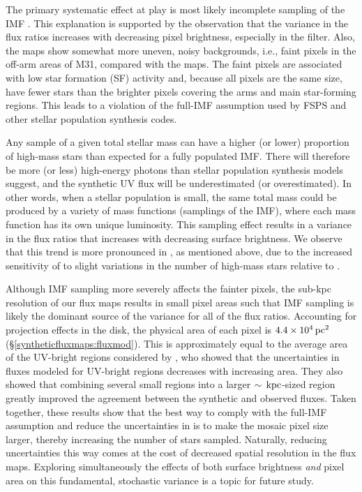 \documentclass[iop, tighten]{emulateapj}
\begin{document}
The primary systematic effect at play is most likely incomplete sampling of the
IMF \citep{Elmegreen:1999, Bastian:2010, Fumagalli:2011, daSilva:2012,
daSilva:2014}. This explanation is supported by the observation that the
variance in the flux ratios increases with decreasing pixel brightness,
especially in the \fuv{} filter. Also, the \fxsfh{} maps show somewhat more
uneven, noisy backgrounds, i.e., faint pixels in the off-arm areas of M31,
compared with the \fxobs{} maps. The faint pixels are associated with low star
formation (SF) activity and, because all pixels are the same size, have fewer
stars than the brighter pixels covering the arms and main star-forming regions.
This leads to a violation of the full-IMF assumption used by FSPS and other
stellar population synthesis codes.

Any sample of a given total stellar mass can have a higher (or lower) proportion
of high-mass stars than expected for a fully populated IMF. There will therefore
be more (or less) high-energy photons than stellar population synthesis models
suggest, and the synthetic UV flux will be underestimated (or overestimated). In
other words, when a stellar population is small, the same total mass could be
produced by a variety of mass functions (samplings of the IMF), where each mass
function has its own unique luminosity. This sampling effect results in a
variance in the flux ratios that increases with decreasing surface brightness.
We observe that this trend is more pronounced in \fuv{}, as mentioned above, due
to the increased sensitivity of \ffuvobs{} to slight variations in the number of
high-mass stars relative to \fnuvobs{}.

Although IMF sampling more severely affects the fainter pixels, the sub-kpc
resolution of our flux maps results in small pixel areas such that IMF sampling
is likely the dominant source of the variance for all of the flux ratios.
Accounting for projection effects in the disk, the physical area of each pixel
is $4.4\times 10^4\,\mathrm{pc}^2$ (\S \ref{syntheticfluxmaps:fluxmod}). This is
approximately equal to the average area of the UV-bright regions considered by
\citet{Simones:2014}, who showed that the uncertainties in fluxes modeled for
UV-bright regions decreases with increasing area. They also showed that
combining several small regions into a larger $\sim\,\mathrm{kpc}$-sized region greatly
improved the agreement between the synthetic and observed fluxes. Taken
together, these results show that the best way to comply with the full-IMF
assumption and reduce the uncertainties in \fxsfh{} is to make the mosaic pixel
size larger, thereby increasing the number of stars sampled. Naturally, reducing
uncertainties this way comes at the cost of decreased spatial resolution in the
flux maps. Exploring simultaneously the effects of both surface brightness
\emph{and} pixel area on this fundamental, stochastic variance is a topic for
future study.
\end{document}
